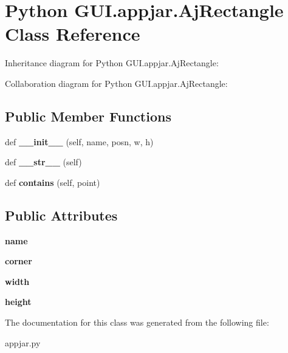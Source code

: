\hypertarget{class_python_01_g_u_i_1_1appjar_1_1_aj_rectangle}{}\section{Python G\+U\+I.\+appjar.\+Aj\+Rectangle Class Reference}
\label{class_python_01_g_u_i_1_1appjar_1_1_aj_rectangle}


Inheritance diagram for Python G\+U\+I.\+appjar.\+Aj\+Rectangle\+:


Collaboration diagram for Python G\+U\+I.\+appjar.\+Aj\+Rectangle\+:
\subsection*{Public Member Functions}
\begin{DoxyCompactItemize}
\item 
\mbox{\label{class_python_01_g_u_i_1_1appjar_1_1_aj_rectangle_ac53c4997421ce9842756938c5465e9ac}} 
def {\bfseries \+\_\+\+\_\+init\+\_\+\+\_\+} (self, name, posn, w, h)
\item 
\mbox{\label{class_python_01_g_u_i_1_1appjar_1_1_aj_rectangle_af25a30c516a9fe4320ea5c2f3f4bbdeb}} 
def {\bfseries \+\_\+\+\_\+str\+\_\+\+\_\+} (self)
\item 
\mbox{\label{class_python_01_g_u_i_1_1appjar_1_1_aj_rectangle_a46b3bfda58665db5e9c68ac315a6f10b}} 
def {\bfseries contains} (self, point)
\end{DoxyCompactItemize}
\subsection*{Public Attributes}
\begin{DoxyCompactItemize}
\item 
\mbox{\label{class_python_01_g_u_i_1_1appjar_1_1_aj_rectangle_a7f5e53c891034354de918216ebd9efa5}} 
{\bfseries name}
\item 
\mbox{\label{class_python_01_g_u_i_1_1appjar_1_1_aj_rectangle_ae429fe0506cd68497bd603aa7fc4451d}} 
{\bfseries corner}
\item 
\mbox{\label{class_python_01_g_u_i_1_1appjar_1_1_aj_rectangle_a6638fb7b1fc7b7476aed77e954ddf5b9}} 
{\bfseries width}
\item 
\mbox{\label{class_python_01_g_u_i_1_1appjar_1_1_aj_rectangle_a9a87c94eb75fec84b998ff4045fc80a9}} 
{\bfseries height}
\end{DoxyCompactItemize}


The documentation for this class was generated from the following file\+:\begin{DoxyCompactItemize}
\item 
appjar.\+py\end{DoxyCompactItemize}

